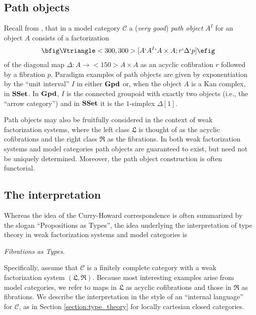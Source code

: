 \documentclass[12pt]{amsart}
\newcommand{\groupoids}{\textnormal{\textbf{Gpd}}}
\newcommand{\ssets}{\textnormal{\textbf{SSet}}}
\theoremstyle{definition}
\theoremstyle{remark}
\begin{document}
\subsection{Path objects}

Recall from \cite{Hovey:MC}, that in a model category $\mathcal{C}$ a (\emph{very good}) \emph{path
  object} $A^{I}$ for an object $A$ consists of a factorization 
\begin{align*}
  \bfig
  \Vtriangle<300,300>[A`A^{I}`A\times A;r`\Delta`p]
  \efig
\end{align*}
of the diagonal map $\Delta:A\to<150>A\times A$ as an acyclic
cofibration $r$ followed by a fibration $p$.  Paradigm examples of
path objects are given by exponentiation by the
``unit interval'' $I$ in either $\groupoids$ or, when the object $A$
is a Kan complex, in $\ssets$.  In
$\groupoids$, $I$ is the connected groupoid with
exactly two objects (i.e., the ``arrow category'') and in $\ssets$ it
is the $1$-simplex $\Delta[1]$.

Path objects may also be fruitfully considered in the context of weak
factorization systems, where the left class $\mathfrak{L}$ is
thought of as the acyclic cofibrations and the right class
$\mathfrak{R}$ as the fibrations.  In both weak factorization systems
and model categories path objects are guaranteed to exist, but need
not be uniquely determined.  Moreover,
the path object construction is often functorial.

\subsection{The interpretation}

Whereas the idea of the Curry-Howard correspondence is often
summarized by the slogan ``Propositions as Types'', the idea
underlying the interpretation of type theory in weak factorization
systems and model categories is 
\begin{center}
  \emph{Fibrations as Types}.
\end{center}
Specifically, assume that $\mathcal{C}$ is a finitely complete
category with a weak factorization system
$(\mathfrak{L},\mathfrak{R})$.  Because most interesting examples
arise from model categories, we refer to maps in $\mathfrak{L}$ as
acyclic cofibrations and those in $\mathfrak{R}$
as fibrations.  We describe the interpretation in the style of an
``internal language'' for $\mathcal{C}$, as in Section
\ref{section:type_theory} for locally cartesian closed categories.
\end{document}
